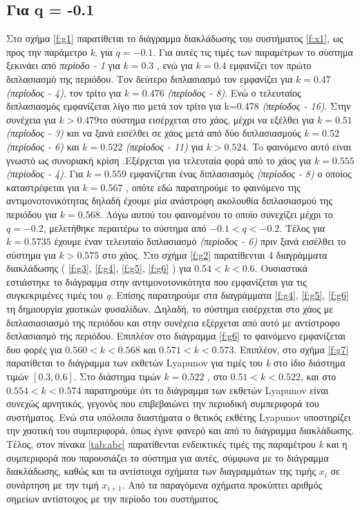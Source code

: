 \subsection{Για q = -0.1 }


	
Στο σχήμα \ref{f:g1} παρατίθεται το διάγραμμα διακλάδωσης του συστήματος \ref{f:x1}, ως προς την παράμετρο \emph{k}, για $q =- 0.1$. Για αυτές τις τιμές των παραμέτρων το σύστημα ξεκινάει από \emph{περίοδο - 1} για $k=0.3$ , ενώ για  $k = 0.4$ εμφανίζει τον πρώτο διπλασιασμό της περιόδου. Τον δεύτερο διπλασιασμό τον εμφανίζει για $k=0.47$\emph{(περίοδος -   4)}, τον τρίτο για $k=0.476$ \emph{(περίοδος -   8)}. Ενώ ο τελευταίος διπλασιασμός εμφανίζεται λίγο πιο μετά τον τρίτο για k=0.478 \emph{(περίοδος -   16)}. Στην συνέχεια για $k>0.479$το σύστημα εισέρχεται στο χάος, μέχρι να εξέλθει  για $k=0.51$ \emph{(περίοδος -   3)} και να ξανά εισέλθει σε χάος μετά από δύο διπλασιασμούς $k=0.52$ \emph{(περίοδος -   6)} και $k=0.522$ \emph{(περίοδος -   11)} για $k>0.524$. To φαινόμενο αυτό είναι γνωστό ως συνοριακή κρίση .Εξέρχεται για τελευταία φορά από το χάος για $k=0.555$ \emph{(περίοδος -   4)}. Για $k=0.559$ εμφανίζεται ένας διπλασιασμός \emph{(περίοδος -   8)} ο οποίος καταστρέφεται για $k=0.567$ , οπότε εδώ παρατηρούμε το φαινόμενο της αντιμονοτονικότητας δηλαδή έχουμε μία ανάστροφη ακολουθία διπλασιασμού της περιόδου για $k=0.568$. Λόγω αυτού του φαινομένου το οποίο συνεχίζει μέχρι το $q=-0.2$, μελετήθηκε περαιτέρω το σύστημα από $-0.1<q<-0.2$. Τέλος για $k=0.5735$ έχουμε έναν τελευταίο διπλασιασμό \emph{(περίοδος -   6)} πριν ξανά εισέλθει το σύστημα για $k>0.575$ στο χάος.
Στο σχήμα \ref{f:g2} παρατίθενται 4 διαγράμματα διακλάδωσης 
( \ref{f:g3}, \ref{f:g4}, \ref{f:g5}, \ref{f:g6} )
για $0.54<k<0.6$. Ουσιαστικά εστιάστηκε το διάγραμμα στην αντιμονοτονικότητα που εμφανίζεται για τις συγκεκριμένες τιμές του \emph{q}. Επίσης παρατηρούμε στα διαγράμματα \ref{f:g4}, \ref{f:g5}, \ref{f:g6} τη δημιουργία χαοτικών φυσαλίδων. Δηλαδή, το σύστημα εισέρχεται στο χάος με διπλασιασιασμό της περιόδου και στην συνέχεια εξέρχεται από αυτό με αντίστροφο διπλασιασμό της περιόδου. Επιπλέον στο διάγραμμα \ref{f:g6} το φαινόμενο εμφανίζεται δυο φορές  για $0.560<k<0.568$ και $0.571<k<0.573$. 
Επιπλέον, στο σχήμα \ref{f:g7} παρατίθεται το διάγραμμα των εκθετών Lyapunov για τιμές του \emph{k} στο ίδιο διάστημα τιμών $[0.3, 0.6]$.  Στο διάστημα τιμών   $k=0.522$ , στο $0.51<k<0.522$, και στο $0.554<k<0.574$ παρατηρούμε ότι το διάγραμμα των εκθετών Lyapunov είναι συνεχώς αρνητικός, γεγονός που επιβεβαιώνει την περιοδική συμπεριφορά του συστήματος. Ενώ στα υπόλοιπα διαστήματα ο θετικός εκθέτης Lyapunov υποστηρίζει την χαοτική του συμπεριφορά, όπως έγινε φανερό και από το διάγραμμα διακλάδωσης.
Τέλος, στον πίνακα \ref{tab:abc} παρατίθενται ενδεικτικές τιμές της παραμέτρου \emph{k} και η συμπεριφορά που παρουσιάζει το σύστημα για αυτές, σύμφωνα με το διάγραμμα διακλάδωσης, καθώς και τα αντίστοιχα σχήματα των διαγραμμάτων της τιμής \(x_i\) σε συνάρτηση με την τιμή \(x_{i+1}\). Από τα παραγόμενα σχήματα προκύπτει αριθμός σημείων αντίστοιχος με την περίοδο του συστήματος.



